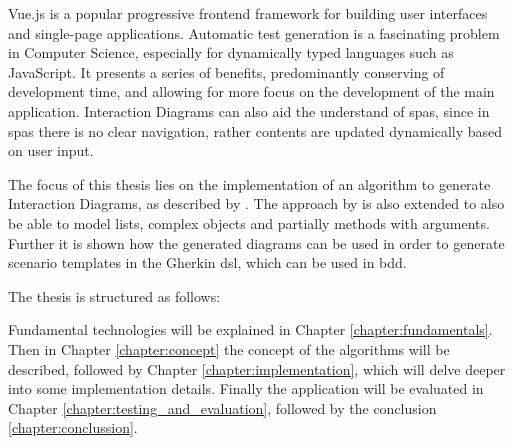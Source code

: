 Vue.js \parencite{vuejs_gh} is a popular progressive frontend framework for building user interfaces and single-page applications. Automatic test generation is a fascinating problem in Computer Science, especially for dynamically typed languages such as JavaScript. It presents a series of benefits, predominantly conserving of development time, and allowing for more focus on the development of the main application. Interaction Diagrams can also aid the understand of \glspl{spa}, since in \glspl{spa} there is no clear navigation, rather contents are updated dynamically based on user input. 

The focus of this thesis lies on the implementation of an algorithm to generate Interaction Diagrams, as described by \textcite{zhang2019scenario}. The approach by \textcite{zhang2019scenario} is also  extended to also be able to model lists, complex objects and partially methods with arguments. Further it is shown how the generated diagrams can be used in order to generate scenario templates in the Gherkin \gls{dsl}, which can be used in \gls{bdd}.


The thesis is structured as follows:

Fundamental technologies will be explained in Chapter \ref{chapter:fundamentals}. Then in Chapter \ref{chapter:concept} the concept of the algorithms will be described, followed by Chapter \ref{chapter:implementation}, which will delve deeper into some implementation details. Finally the application will be evaluated in Chapter \ref{chapter:testing_and_evaluation},
followed by the conclusion \ref{chapter:conclussion}.